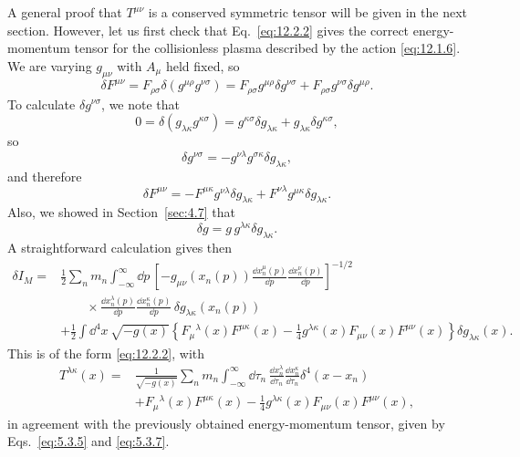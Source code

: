 A general proof that \(T^{\mu\nu}\) is a conserved symmetric tensor will be
given in the next section. However, let us first check that
Eq.~\eqref{eq:12.2.2} gives the correct energy-momentum tensor for the
collisionless plasma described by the action \eqref{eq:12.1.6}. We are
varying \(g_{\mu\nu}\) with \(A_\mu\) held fixed, so
\[
  \delta F^{\mu\nu}
  =
  F_{\rho\sigma}\delta(g^{\mu\rho}g^{\nu\sigma})
  =
  F_{\rho\sigma}g^{\mu\rho}\delta g^{\nu\sigma}
  +F_{\rho\sigma}g^{\nu\sigma}\delta g^{\mu\rho}.
\]
To calculate \(\delta g^{\nu\sigma}\), we note that
\[
  0
  =
  \delta(g_{\lambda\kappa}g^{\kappa\sigma})
  =
  g^{\kappa\sigma}\delta g_{\lambda\kappa}
  +g_{\lambda\kappa}\delta g^{\kappa\sigma},
\]
so
\[
  \delta g^{\nu\sigma}
  =
  -g^{\nu\lambda}g^{\sigma\kappa}\delta g_{\lambda\kappa},
\]
and therefore
\[
  \delta F^{\mu\nu}
  =
  -F^{\mu\kappa}g^{\nu\lambda}\delta g_{\lambda\kappa}
  +F^{\nu\lambda}g^{\mu\kappa}\delta g_{\lambda\kappa}.
\]
Also, we showed in Section~\ref{sec:4.7} that
\[
  \delta g=g\,g^{\lambda\kappa}\delta g_{\lambda\kappa}.
\]
A straightforward calculation gives then
\[
\begin{aligned}
\delta I_M={}&
\frac12\sum_n m_n\int_{-\infty}^{\infty}\dd p\,
\left[
  -g_{\mu\nu}(x_n(p))
   \frac{\dd x_n^\mu(p)}{\dd p}
   \frac{\dd x_n^\nu(p)}{\dd p}
\right]^{-1/2}
\\[-2pt]
&\qquad\times
\frac{\dd x_n^\lambda(p)}{\dd p}
\frac{\dd x_n^\kappa(p)}{\dd p}\,
\delta g_{\lambda\kappa}(x_n(p))
\\
&+\frac12\int\dd^4x\,\sqrt{-g(x)}
\left\{
  F_\mu{}^\lambda(x)F^{\mu\kappa}(x)
  -\frac14g^{\lambda\kappa}(x)
   F_{\mu\nu}(x)F^{\mu\nu}(x)
\right\}\delta g_{\lambda\kappa}(x).
\end{aligned}
\]
This is of the form \eqref{eq:12.2.2}, with
\[
\begin{aligned}
T^{\lambda\kappa}(x)={}&
\frac1{\sqrt{-g(x)}}\sum_n m_n
\int_{-\infty}^{\infty}\dd\tau_n\,
\frac{\dd x_n^\lambda}{\dd\tau_n}
\frac{\dd x_n^\kappa}{\dd\tau_n}
\delta^4(x-x_n)
\\
&+F_\mu{}^\lambda(x)F^{\mu\kappa}(x)
-\frac14g^{\lambda\kappa}(x)
F_{\mu\nu}(x)F^{\mu\nu}(x),
\end{aligned}
\]
in agreement with the previously obtained energy-momentum tensor, given by
Eqs.~\eqref{eq:5.3.5} and \eqref{eq:5.3.7}.


